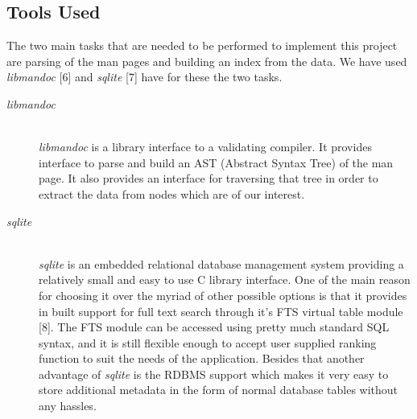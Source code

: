 \documentclass[titlepage, a4paper, 12pt]{article}
\begin{document}
\subsection{Tools Used}
The two main tasks that are needed to be performed to implement this project are
parsing of the man pages
and building an index from the data. We have used \textit{libmandoc} [6]
and \textit{sqlite} [7] have for these the two tasks.
\begin{description}
\item[\textit{libmandoc}] \hfill \\
\textit{libmandoc} is a library interface to a validating compiler. It provides
interface to parse and build an AST (Abstract Syntax Tree) of the man page. It also provides
an interface for traversing that tree in order to extract the data from nodes
which are of our interest.
\end{description}
\begin{description}
\item[\textit{sqlite}] \hfill \\
\textit{sqlite} is an embedded relational database management system providing a
relatively small and easy to use C library interface. One of the main reason
for choosing it over the myriad of other possible options is that it provides
in built support for full text search through it's FTS virtual table module [8].
The FTS module can be accessed using pretty much standard SQL syntax, and it is
still flexible enough to accept user supplied ranking function to suit the needs
of the application. Besides that another advantage of \textit{sqlite} is the
RDBMS support which makes it very easy to store additional metadata in the form
of normal database tables without any hassles.
\end{description}
\end{document}
